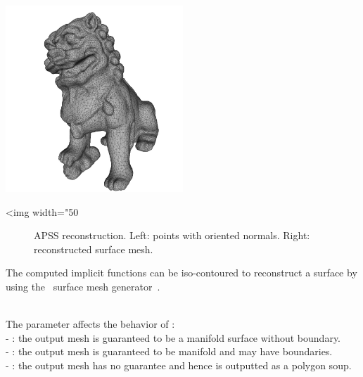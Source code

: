   \\
  \\

\begin{center}
    \label{Surface_reconstruction_3-fig-APSS}
    \begin{ccTexOnly}
        \includegraphics[width=0.5\textwidth]{Surface_reconstruction_3/APSS} %
    \end{ccTexOnly}
    \begin{ccHtmlOnly}
        <img width="50%
    \end{ccHtmlOnly}
    \begin{figure}[h]
        \caption{APSS reconstruction.
        Left: points with oriented normals.
        Right: reconstructed surface mesh.}
    \end{figure}
\end{center}

The computed implicit functions can be iso-contoured to reconstruct a surface by using the \cgal\ surface mesh generator~\cite{cgal:ry-gsddrm-06,cgal:bo-pgsms-05}.

  \\

The parameter  affects the behavior of : \\
- : the output mesh is guaranteed to be a manifold surface without boundary.\\
- : the output mesh is guaranteed to be manifold and may have boundaries.\\
- : the output mesh has no guarantee and hence is outputted as a polygon soup.

